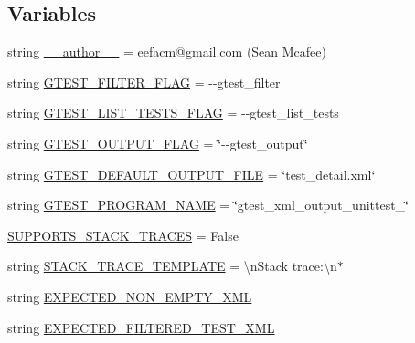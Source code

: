 \subsection*{Variables}
\begin{DoxyCompactItemize}
\item 
string \hyperlink{namespacegtest__xml__output__unittest_a14db59ae462df049de11ee863be54f09}{\+\_\+\+\_\+author\+\_\+\+\_\+} = \textquotesingle{}eefacm@gmail.\+com (Sean Mcafee)\textquotesingle{}
\item 
string \hyperlink{namespacegtest__xml__output__unittest_ab914acfbfbc3f6f5ee3f1e83134c7204}{G\+T\+E\+S\+T\+\_\+\+F\+I\+L\+T\+E\+R\+\_\+\+F\+L\+A\+G} = \textquotesingle{}-\/-\/gtest\+\_\+filter\textquotesingle{}
\item 
string \hyperlink{namespacegtest__xml__output__unittest_aafe4dd234e72bbb61f4f34689fbca5c4}{G\+T\+E\+S\+T\+\_\+\+L\+I\+S\+T\+\_\+\+T\+E\+S\+T\+S\+\_\+\+F\+L\+A\+G} = \textquotesingle{}-\/-\/gtest\+\_\+list\+\_\+tests\textquotesingle{}
\item 
string \hyperlink{namespacegtest__xml__output__unittest_a96dc60b3ea1b2ced315835227f77e10d}{G\+T\+E\+S\+T\+\_\+\+O\+U\+T\+P\+U\+T\+\_\+\+F\+L\+A\+G} = \char`\"{}-\/-\/gtest\+\_\+output\char`\"{}
\item 
string \hyperlink{namespacegtest__xml__output__unittest_a5591d7d52a46da09d06ed3e9ec18711a}{G\+T\+E\+S\+T\+\_\+\+D\+E\+F\+A\+U\+L\+T\+\_\+\+O\+U\+T\+P\+U\+T\+\_\+\+F\+I\+L\+E} = \char`\"{}test\+\_\+detail.\+xml\char`\"{}
\item 
string \hyperlink{namespacegtest__xml__output__unittest_ab89cc5b402310ef67bcaf38fa5017461}{G\+T\+E\+S\+T\+\_\+\+P\+R\+O\+G\+R\+A\+M\+\_\+\+N\+A\+M\+E} = \char`\"{}gtest\+\_\+xml\+\_\+output\+\_\+unittest\+\_\+\char`\"{}
\item 
\hyperlink{namespacegtest__xml__output__unittest_a519f8e4f456ccde7946910725de578a9}{S\+U\+P\+P\+O\+R\+T\+S\+\_\+\+S\+T\+A\+C\+K\+\_\+\+T\+R\+A\+C\+E\+S} = False
\item 
string \hyperlink{namespacegtest__xml__output__unittest_abd57c1a4124b74d2ba63d03734df491d}{S\+T\+A\+C\+K\+\_\+\+T\+R\+A\+C\+E\+\_\+\+T\+E\+M\+P\+L\+A\+T\+E} = \textquotesingle{}\textbackslash{}n\+Stack trace\+:\textbackslash{}n$\ast$\textquotesingle{}
\item 
string \hyperlink{namespacegtest__xml__output__unittest_ab6a01b4b81a702e476f53b1b3c4983c0}{E\+X\+P\+E\+C\+T\+E\+D\+\_\+\+N\+O\+N\+\_\+\+E\+M\+P\+T\+Y\+\_\+\+X\+M\+L}
\item 
string \hyperlink{namespacegtest__xml__output__unittest_a1adb060422f833cb8b99403d13144399}{E\+X\+P\+E\+C\+T\+E\+D\+\_\+\+F\+I\+L\+T\+E\+R\+E\+D\+\_\+\+T\+E\+S\+T\+\_\+\+X\+M\+L}

\end{DoxyCompactItemize}
